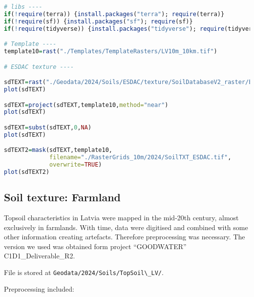\documentclass[
]{book}
\newcommand{\passthrough}[1]{#1}
\begin{document}
\begin{lstlisting}[language=R]
# libs ----
if(!require(terra)) {install.packages("terra"); require(terra)}
if(!require(sf)) {install.packages("sf"); require(sf)}
if(!require(tidyverse)) {install.packages("tidyverse"); require(tidyverse)}

# Template ----
template10=rast("./Templates/TemplateRasters/LV10m_10km.tif")

# ESDAC texture ----

sdTEXT=rast("./Geodata/2024/Soils/ESDAC/texture/SoilDatabaseV2_raster/ESDB-Raster-Library-1k-GeoTIFF-20240507/TEXT/TEXT.tif")
plot(sdTEXT)

sdTEXT=project(sdTEXT,template10,method="near")
plot(sdTEXT)

sdTEXT=subst(sdTEXT,0,NA)
plot(sdTEXT)

sdTEXT2=mask(sdTEXT,template10,
             filename="./RasterGrids_10m/2024/SoilTXT_ESDAC.tif",
             overwrite=TRUE)
plot(sdTEXT2)
\end{lstlisting}

\subsection{Soil texture: Farmland}\label{Ch04.07.03}

Topsoil characteristics in Latvia were mapped in the mid-20th century, almost
exclusively in farmlands. With time, data were digitised and combined with some
other information creating artefacts. Therefore preprocessing was necessary. The
version we used was obtained form project ``GOODWATER'' C1D1\_Deliverable\_R2.

File is stored at \passthrough{\lstinline!Geodata/2024/Soils/TopSoil\_LV/!}.

Preprocessing included:
\end{document}
